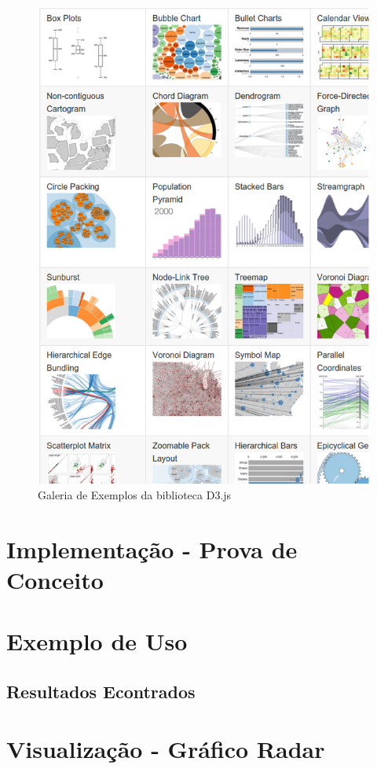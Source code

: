 \begin{figure}[!htb]
	\centering
    \includegraphics[keepaspectratio=true,scale=0.5]
    {figuras/d3_gallery.eps}
  \caption{Galeria de Exemplos da biblioteca D3.js}
  \label{fig:d3_gallery}
\end{figure}

\section{Implementação - Prova de Conceito}

\section{Exemplo de Uso}


\subsection{Resultados Econtrados}

\section{Visualização - Gráfico Radar}
